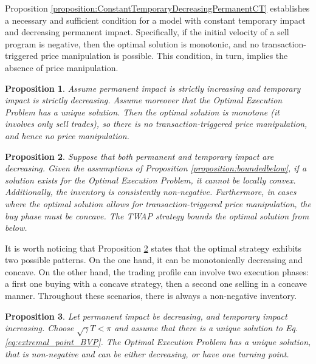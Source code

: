 \documentclass[final,3p,authoryear,12pt]{elsarticle}
\newtheorem{remark}{Remark}
\newtheorem{proposition}{Proposition}
\begin{document}
    Proposition \ref{proposition:ConstantTemporaryDecreasingPermanentCT} establishes a necessary and sufficient condition for a model with constant temporary impact and decreasing permanent impact. Specifically, if the initial velocity of a sell program is negative, then the optimal solution is monotonic, and no transaction-triggered price manipulation is possible. This condition, in turn, implies the absence of price manipulation. 

\begin{proposition}
\label{proposition:Temporary_decrease_Permanent_increase}
Assume permanent impact is strictly increasing and temporary impact is strictly
decreasing. Assume moreover that the Optimal Execution Problem has a unique
solution. Then the optimal solution is monotone (it involves only sell trades),
so there is no transaction-triggered price manipulation, and hence no price
manipulation.
\end{proposition}

\begin{proposition}
\label{proposition:DecreasingImpacts}
    Suppose that both permanent and temporary impact are decreasing. Given the assumptions of Proposition \ref{proposition:boundedbelow}, if a solution exists for the Optimal Execution Problem, it cannot be locally convex. Additionally, the inventory is consistently non-negative. Furthermore, in cases where the optimal solution allows for transaction-triggered price manipulation, the buy phase must be concave. The TWAP strategy bounds the optimal solution from below. 
\end{proposition}

    It is worth noticing that Proposition \ref{proposition:DecreasingImpacts} states that the optimal strategy exhibits two possible patterns. On the one hand, it can be monotonically decreasing and concave. On the other hand, the trading profile can involve two execution phases: a first one buying with a concave strategy, then a second one selling in a concave manner. Throughout these scenarios, there is always a non-negative inventory.

\begin{proposition}
\label{proposition:Temporary_increase_Permanent_decrease}
    Let permanent impact be decreasing, and temporary impact increasing. Choose $\sqrt{\gamma}T<\pi$ and assume that there is a unique solution to Eq. \eqref{eq:extremal_point_BVP}. The Optimal Execution Problem has a unique solution, that is non-negative and can be either decreasing, or have one turning point.
\end{proposition}
\end{document}

